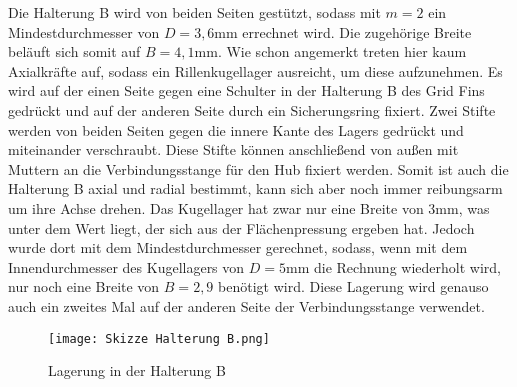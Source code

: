 Die Halterung B wird von beiden Seiten gestützt, sodass mit $m = 2$ ein Mindestdurchmesser von $D = 3,6$mm errechnet wird. Die zugehörige Breite beläuft sich somit auf $B = 4,1$mm. Wie schon angemerkt treten hier kaum Axialkräfte auf, sodass ein Rillenkugellager ausreicht, um diese aufzunehmen. Es wird auf der einen Seite gegen eine Schulter in der Halterung B des Grid Fins gedrückt und auf der anderen Seite durch ein Sicherungsring fixiert. Zwei Stifte werden von beiden Seiten gegen die innere Kante des Lagers gedrückt und miteinander verschraubt. Diese Stifte können anschließend von außen mit Muttern an die Verbindungsstange für den Hub fixiert werden. Somit ist auch die Halterung B axial und radial bestimmt, kann sich aber noch immer reibungsarm um ihre Achse drehen. Das Kugellager hat zwar nur eine Breite von 3mm, was unter dem Wert liegt, der sich aus der Flächenpressung ergeben hat. Jedoch wurde dort mit dem Mindestdurchmesser gerechnet, sodass, wenn mit dem Innendurchmesser des Kugellagers von $D = 5$mm die Rechnung wiederholt wird, nur noch eine Breite von $B =2,9$ benötigt wird. Diese Lagerung wird genauso auch ein zweites Mal auf der anderen Seite der Verbindungsstange verwendet.
\begin{figure}[h] 
	\centering
	\texttt{[image: Skizze Halterung B.png]}
	\caption{Lagerung in der Halterung B}
\end{figure}
